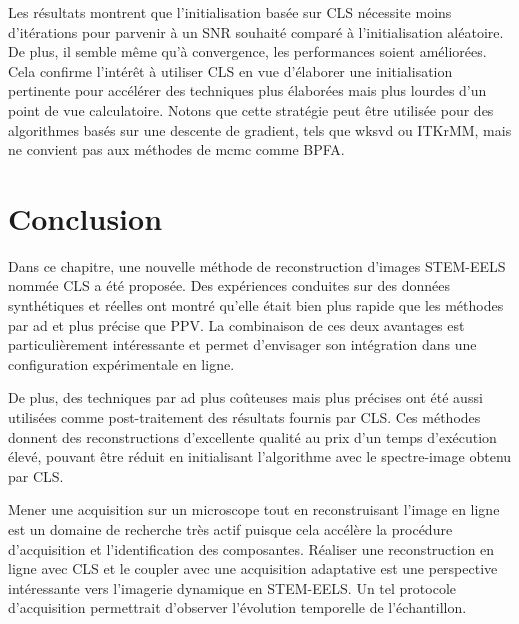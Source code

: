 Les résultats montrent que l'initialisation basée sur CLS nécessite moins d'itérations pour parvenir à un SNR souhaité comparé à l'initialisation aléatoire. De plus, il semble même qu'à convergence, les performances soient améliorées.
%
Cela confirme l'intérêt à utiliser CLS en vue d'élaborer une initialisation pertinente pour accélérer des techniques plus élaborées mais plus lourdes d'un point de vue calculatoire.  Notons que cette stratégie peut être utilisée pour des algorithmes basés sur une descente de gradient, tels que \gls{wksvd} ou ITKrMM, mais ne convient pas aux méthodes de \gls{mcmc} comme BPFA.


%
\section{Conclusion}

Dans ce chapitre, une nouvelle méthode de reconstruction d'images STEM-EELS nommée CLS a été proposée. Des expériences conduites sur des données synthétiques et réelles ont montré qu'elle était bien plus rapide que les méthodes par \gls{ad} et plus précise que PPV. La combinaison de ces deux avantages est particulièrement intéressante et permet d'envisager son intégration dans une configuration expérimentale en ligne.

De plus, des techniques par \gls{ad} plus coûteuses mais plus précises ont été aussi utilisées comme post-traitement des résultats fournis par CLS. 
%
Ces méthodes donnent des reconstructions d'excellente qualité au prix d'un temps d'exécution élevé, pouvant être réduit en initialisant l'algorithme avec le spectre-image obtenu par CLS.

Mener une acquisition sur un microscope tout en reconstruisant l'image en ligne est un domaine de recherche très actif puisque cela accélère la procédure d'acquisition et l'identification des composantes. Réaliser une reconstruction en ligne avec CLS et le coupler avec une acquisition adaptative est une perspective intéressante vers l'imagerie dynamique en STEM-EELS. Un tel protocole d'acquisition permettrait d'observer l'évolution temporelle de l'échantillon.




